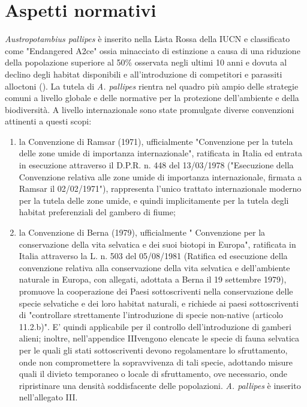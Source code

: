 \documentclass[11pt,a4paper,italian,twoside,openany]{memoir}
\begin{document}
\section{Aspetti normativi}
\label{sec_normativa}
\emph{Austropotambius pallipes} è inserito nella Lista Rossa della IUCN e classificato come "Endangered A2ce" ossia minacciato di estinzione a causa di una riduzione della popolazione superiore al 50\% osservata negli ultimi 10 anni e dovuta al declino degli habitat disponibili e all'introduzione di competitori e parassiti alloctoni (\cite{IUCN 2013}). La tutela di \emph{A. pallipes} rientra nel quadro più ampio delle strategie comuni a livello globale e delle normative per la protezione dell'ambiente e della biodiversità. A livello internazionale sono state promulgate diverse convenzioni attinenti a questi scopi:
\begin{enumerate}[label=\roman*]
  \item la Convenzione di Ramsar (1971), ufficialmente "Convenzione per la tutela delle zone umide di importanza internazionale", ratificata in Italia ed entrata in esecuzione attraverso il D.P.R. n. 448 del 13/03/1978 ("Esecuzione della Convenzione relativa alle zone umide di importanza internazionale, firmata a Ramsar il 02/02/1971"), rappresenta l'unico trattato internazionale moderno per la tutela delle zone umide, e quindi implicitamente per la tutela degli habitat preferenziali del gambero di fiume; 
  \item la Convenzione di Berna (1979), ufficialmente " Convenzione per la conservazione della vita selvatica e dei suoi biotopi in Europa", ratificata in Italia attraverso la L. n. 503 del 05/08/1981 (Ratifica ed esecuzione della convenzione relativa alla conservazione della vita selvatica e dell'ambiente naturale in Europa, con allegati, adottata a Berna il 19 settembre 1979),  promuove la cooperazione dei Paesi sottoscriventi nella conservazione delle specie selvatiche e dei loro habitat naturali, e richiede ai paesi sottoscriventi di "controllare strettamente l'introduzione di specie non-native (articolo 11.2.b)". E' quindi applicabile per il controllo dell'introduzione di gamberi alieni; inoltre, nell'appendice IIIvengono elencate le specie di fauna selvatica per le quali gli stati sottoscriventi devono regolamentare lo sfruttamento, onde non compromettere la sopravvivenza di tali specie, adottando misure quali il divieto temporaneo o locale di sfruttamento, ove necessario, onde ripristinare una densità soddisfacente delle popolazioni. \emph{A. pallipes} è inserito nell'allegato III.

\end{enumerate}
\end{document}
